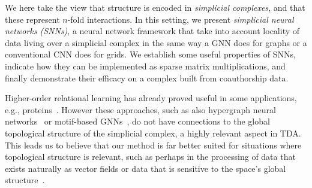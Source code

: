 We here take the view that structure is encoded in \emph{simplicial complexes}, and that these represent $n$-fold interactions. In this setting, we present \emph{simplicial neural networks (SNNs)}, a neural network framework that take into account locality of data living over a simplicial complex in the same way a GNN does for graphs or a conventional CNN does for grids.
We establish some useful properties of SNNs, indicate how they can be implemented as sparse matrix multiplications, and finally demonstrate their efficacy on a complex built from coauthorship data.

Higher-order relational learning has already proved useful in some applications, e.g., proteins~\cite{ze2020graph}. However these approaches, such as also hypergraph neural networks~\cite{feng2018hypergraphs} or motif-based GNNs~\cite{monti2018motif}, do not have connections to the global topological structure of the simplicial complex, a highly relevant aspect in TDA. 
This leads us to believe that our method is far better suited for situations where topological structure is relevant, such as perhaps in the processing of data that exists naturally as vector fields or data that is sensitive to the space's global structure~\cite{deepsphere}.
